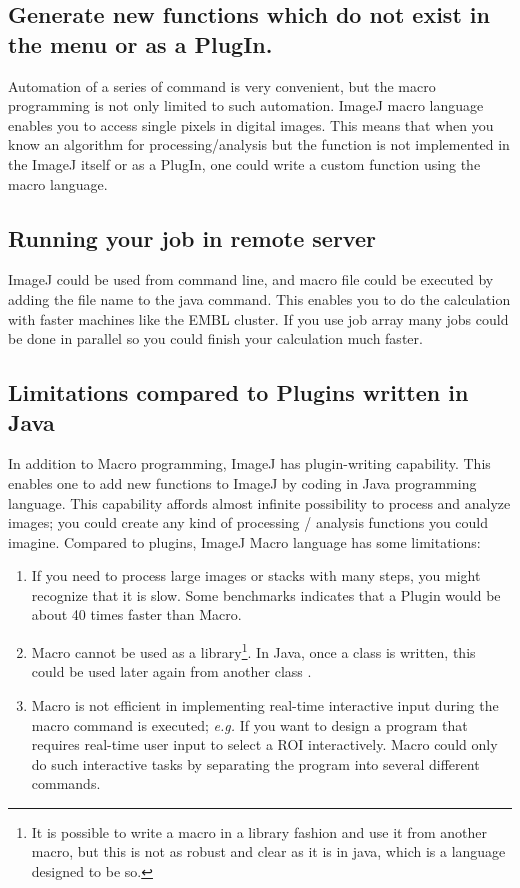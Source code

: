 \documentclass[11pt,a4paper,oneside]{report}
\begin{document}
\subsection{Generate new functions which do not exist in the menu or as a PlugIn.}
Automation of a series of command is very convenient, but the macro programming is not only limited to such automation. ImageJ macro language enables you to access single pixels in digital images. This means that when you know an algorithm for processing/analysis but the function is not implemented in the ImageJ itself or as a PlugIn, one could write a custom function using the macro language.
\subsection{Running your job in remote server}
ImageJ could be used from command line, and macro file could be executed by adding the file name to the java command. This enables you to do the calculation with faster machines like the EMBL cluster. If you use job array many jobs could be done in parallel so you could finish your calculation much faster.

\subsection{Limitations compared to Plugins written in Java}

In addition to Macro programming, ImageJ has plugin-writing capability. This enables one to add new functions to ImageJ by coding in Java programming language. This capability affords almost infinite possibility to process and analyze images; you could create any kind of processing / analysis functions you could imagine. Compared to plugins, ImageJ Macro language has some limitations: 

\begin{enumerate}
\item If you need to process large images or stacks with many steps, you might recognize that it is slow. Some benchmarks indicates that a Plugin would be about 40 times faster than Macro. 

\item Macro cannot be used as a library\footnote{It is possible to write a macro in a library fashion and use it from another macro, but this is not as robust and clear as it is in java, which is a language designed to be so.}. In Java, once a class is written, this could be used later again from another class . 

\item Macro is not efficient in implementing real-time interactive input during the macro command is executed; \textit{e.g.} If you want to design a program that requires real-time user input to select a ROI interactively.  Macro could only do such interactive tasks by separating the program into several different commands. 
\end{enumerate}
\end{document}
